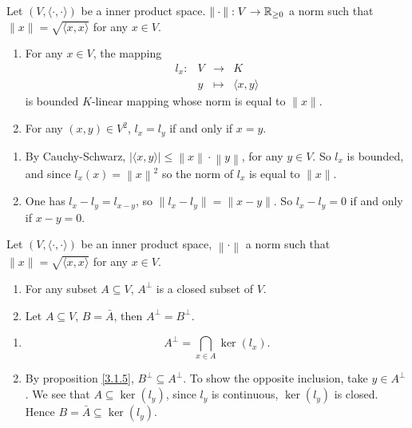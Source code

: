 \begin{propositionenv}\label{prop:3.1.8}
    Let $(V,\langle \cdot ,\cdot\rangle)$ be a inner product space. $\| \cdot \|: V\rightarrow \mathbb{R}_{\ge 0}$ a norm such that $\| x\| = \sqrt{\langle x,x\rangle}$ for any $x\in V$.
    \begin{enumerate}
        \item For any $ x\in V $, the mapping
        $$\begin{array}{rrcl}
            l_x: & V & \rightarrow & K\\
            & y & \mapsto & \langle x,y\rangle
        \end{array}$$
        is bounded $K$-linear mapping whose norm is equal to $\|x\|$.
        \item For any $(x,y)\in V^2$, $l_x = l_y$ if and only if $x = y$.
    \end{enumerate}
\end{propositionenv}
\begin{proofenv}
    \quad
    \begin{enumerate}
        \item By Cauchy-Schwarz, $\left| \langle x,y\rangle \right| \le \left\| x \right\| \cdot \left\| y \right\|$, for any $y \in V$.
        So $l_x$ is bounded, and since $l_x (x) = \left\| x\right\|^2$ so the norm of $l_x$ is equal to $\| x\|$.
        \item One has $l_x - l_y = l_{x-y}$, so $\| l_x - l_y \| = \|x -y\|$. So $l_x - l_y =0$ if and only if $x - y =0$.
    \end{enumerate}
\end{proofenv}
\begin{propositionenv}\label{prop:3.1.9}
    Let $\left(V,\langle \cdot ,\cdot\rangle\right)$ be an inner product space, $\left\| \cdot \right\|$ a norm such that $\| x\| = \sqrt{\langle x,x\rangle}$ for any $x\in V$.
    \begin{enumerate}
        \item For any subset $A \subseteq V$, $A^\perp$ is a closed subset of $V$.
        \item Let $A \subseteq V$, $B = \bar{A}$, then $A^\perp = B^\perp$.
    \end{enumerate}
\end{propositionenv}
\begin{proofenv}
    \quad 
    \begin{enumerate}
        \item $$A^\perp = \bigcap_{x\in A} \ker\left(l_x\right).$$
        \item By proposition \ref{3.1.5}, $B^\perp \subseteq A^\perp$. To show the opposite inclusion, take $ y\in A^\perp$.
        We see that $A \subseteq \ker\left(l_y\right)$, since $l_y$ is continuous, $\ker\left(l_y\right)$ is closed. 
        Hence $B =\bar{A} \subseteq \ker\left(l_y\right)$.
    \end{enumerate}
\end{proofenv}
